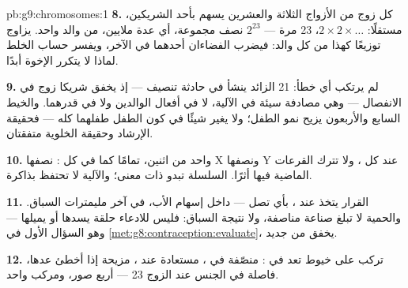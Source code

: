 \begin{solution}{pb:g9:chromosomes:1}
\textbf{8.} كل زوج من الأزواج الثلاثة والعشرين يسهم
بأحد الشريكين، مستقلًا: $2 \times 2 \times \dots$، 23
مرة --- $2^{23}$ نصف مجموعة، أي عدة ملايين، من والد
واحد.  يزاوج توزيعًا كهذا من كل والد: فيضرب
الفضاءان أحدهما في الآخر، ويفسر حساب الخلط لماذا لا
يتكرر الإخوة أبدًا.

\textbf{9.} لم يرتكب أي خطأ:  21 الزائد ينشأ في
حادثة تنصيف --- إذ يخفق شريكا زوج في الانفصال --- وهي
مصادفة سيئة في الآلية، لا في أفعال الوالدين ولا في
قدرهما. والخيط السابع والأربعون يزيح نمو الطفل؛ ولا يغير
شيئًا في كون الطفل طفلهما كله --- فحقيقة الإرشاد وحقيقة
 الخلوية متفقتان.

\textbf{10.} واحد من اثنين، تمامًا كما في كل :
  نصفها X ونصفها Y عند كل ، ولا تترك
القرعات الماضية فيها أثرًا. السلسلة تبدو ذات معنى؛
والآلية لا تحتفظ بذاكرة.

\textbf{11.} القرار يتخذ عند ، بأي  تصل ---
داخل إسهام الأب، في آخر مليمترات السباق. والحمية لا تبلغ
صناعة   مناصفة، ولا نتيجة السباق: فليس
للادعاء حلقة يسدها أو يميلها --- وهو السؤال الأول في
\cref{met:g8:contraception:evaluate}، يخفق من جديد.

\textbf{12.}  تركب على خيوط تعد في :
منصّفة في ، مستعادة عند ، مزيحة  إذا
أخطئ عدها، فاصلة في الجنس عند الزوج 23 --- أربع صور،
ومركب واحد.
\end{solution}
